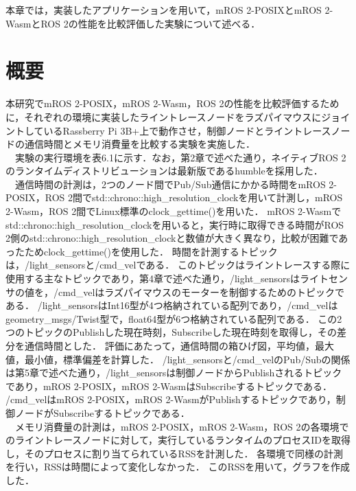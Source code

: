 本章では，実装したアプリケーションを用いて，mROS 2-POSIXとmROS 2-WasmとROS 2の性能を比較評価した実験について述べる．
\section{概要}
本研究でmROS 2-POSIX，mROS 2-Wasm，ROS 2の性能を比較評価するために，それぞれの環境に実装したライントレースノードをラズパイマウスにジョイントしているRassberry Pi 3B+上で動作させ，制御ノードとライントレースノードの通信時間とメモリ消費量を比較する実験を実施した．
\\　実験の実行環境を表6.1に示す．なお，第2章で述べた通り，ネイティブROS 2のランタイムディストリビューションは最新版であるhumbleを採用した．
\\　通信時間の計測は，2つのノード間でPub/Sub通信にかかる時間をmROS 2-POSIX，ROS 2間でstd::chrono::high\_resolution\_clockを用いて計測し，mROS 2-Wasm，ROS 2間でLinux標準のclock\_gettime()を用いた．
mROS 2-Wasmでstd::chrono::high\_resolution\_clockを用いると，実行時に取得できる時間がROS 2側のstd::chrono::high\_resolution\_clockと数値が大きく異なり，比較が困難であったためclock\_gettime()を使用した．
時間を計測するトピックは，/light\_sensorsと/cmd\_velである．
このトピックはライントレースする際に使用する主なトピックであり，第4章で述べた通り，/light\_sensorsはライトセンサの値を，/cmd\_velはラズパイマウスのモーターを制御するためのトピックである．
/light\_sensorsはInt16型が4つ格納されている配列であり，/cmd\_velはgeometry\_msgs/Twist型で，float64型が6つ格納されている配列である．
この2つのトピックのPublishした現在時刻，Subscribeした現在時刻を取得し，その差分を通信時間とした．
評価にあたって，通信時間の箱ひげ図，平均値，最大値，最小値，標準偏差を計算した．
/light\_sensorsと/cmd\_velのPub/Subの関係は第5章で述べた通り，/light\_sensorsは制御ノードからPublishされるトピックであり，mROS 2-POSIX，mROS 2-WasmはSubscribeするトピックである．
/cmd\_velはmROS 2-POSIX，mROS 2-WasmがPublishするトピックであり，制御ノードがSubscribeするトピックである．
\\　メモリ消費量の計測は，mROS 2-POSIX，mROS 2-Wasm，ROS 2の各環境でのライントレースノードに対して，実行しているランタイムのプロセスIDを取得し，そのプロセスに割り当てられているRSSを計測した．
各環境で同様の計測を行い，RSSは時間によって変化しなかった．
このRSSを用いて，グラフを作成した．
